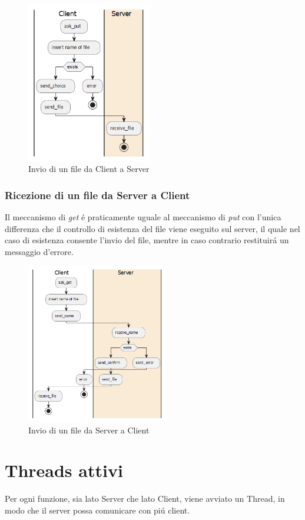 \documentclass[a4paper, 12pt]{report}
\begin{document}
\begin{figure}[H]
    \centering
    \includegraphics[height=7cm]{img/clientToServer.png}
    \caption{Invio di un file da Client a Server}
\end{figure}

\newpage
\subsection{Ricezione di un file da Server a Client}
Il meccanismo di \emph{get} é praticamente uguale al meccanismo di \emph{put} con l'unica differenza
che il controllo di esistenza del file viene eseguito sul server, il quale nel caso di esistenza
consente l'invio del file, mentre in caso contrario restituirá un messaggio d'errore.

\begin{figure}[H]
    \centering
    \includegraphics[height=7cm]{img/serverToClient.png}
    \caption{Invio di un file da Server a Client}
\end{figure}

\chapter{Threads attivi}
Per ogni funzione, sia lato Server che lato Client, viene avviato un Thread, in modo che il server possa comunicare
con piú client.
\end{document}
